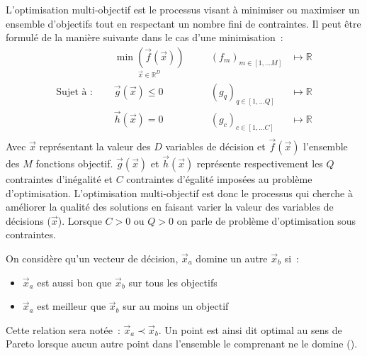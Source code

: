 \begin{Def}\label{def:optimisation_multi_objectif}
L’optimisation multi-objectif est le processus visant à minimiser ou maximiser un ensemble
d’objectifs tout en respectant un nombre fini de contraintes.
Il peut être formulé de la manière suivante dans le cas d’une minimisation~:
\begin{equation}\label{eq:def_optimisation}
  \begin{aligned}
                           & \underset{\vec{x} \in \mathbb{R}^{D}}{\min(\vec{f}(\vec{x}))}&
                           & \quad (f_{m})_{m \in [1,\dotsc M]} & \longmapsto \mathbb{R} \\
    \text{Sujet à~: }\quad & \vec{g}(\vec{x}) \leqslant 0                                 &
                           & \quad (g_{q})_{q \in [1,\dotsc Q]} & \longmapsto \mathbb{R} \\
                           & \vec{h}(\vec{x}) = 0                                         &
                           & \quad (g_{c})_{c \in [1,\dotsc C]} & \longmapsto \mathbb{R} \\
  \end{aligned}
\end{equation}
Avec $\vec{x}$ représentant la valeur des $D$ variables de décision et
$\vec{f}(\vec{x})$ l’ensemble des $M$ fonctions objectif.  $\vec{g}(\vec{x})$ et
$\vec{h}(\vec{x})$ représente respectivement les $Q$ contraintes d’inégalité et
$C$ contraintes d’égalité imposées au problème d’optimisation. L’optimisation
multi-objectif est donc le processus qui cherche à améliorer la qualité des
solutions en faisant varier la valeur des variables de décisions ($\vec{x}$).
Lorsque $C > 0$ ou $Q > 0$ on parle de problème d’optimisation sous contraintes.
\end{Def}

\begin{Def}\label{def:dominance_de_pareto}
On considère qu’un vecteur de décision, $\vec{x}_{a}$ domine un autre $\vec{x}_{b}$ si~:
\begin{itemize}
  \item $\vec{x}_{a}$ est aussi bon que $\vec{x}_{b}$ sur tous les objectifs
  \item $\vec{x}_{a}$ est meilleur que $\vec{x}_{b}$ sur au moins un objectif
\end{itemize}
Cette relation sera notée~: $\vec{x}_{a} \prec \vec{x}_{b}$.
Un point est ainsi dit optimal au sens de Pareto lorsque aucun autre point dans
l’ensemble le comprenant ne le domine ().
\end{Def}

